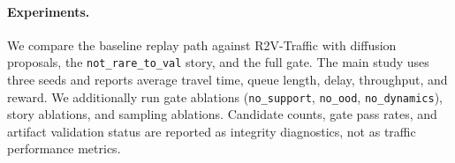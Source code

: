 \paragraph{Experiments.}
We compare the baseline replay path against R2V-Traffic with diffusion proposals, the \texttt{not\_rare\_to\_val} story, and the full gate. The main study uses three seeds and reports average travel time, queue length, delay, throughput, and reward. We additionally run gate ablations (\texttt{no\_support}, \texttt{no\_ood}, \texttt{no\_dynamics}), story ablations, and sampling ablations. Candidate counts, gate pass rates, and artifact validation status are reported as integrity diagnostics, not as traffic performance metrics.
